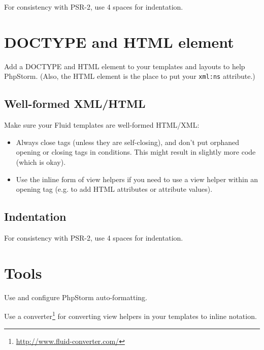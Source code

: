 For consistency with PSR-2, use 4 spaces for indentation.


\section{DOCTYPE and HTML element}
Add a DOCTYPE and HTML element to your templates and layouts to help PhpStorm. (Also, the HTML element is the place to put your \texttt{xml:ns} attribute.)

\subsection{Well-formed XML/HTML}

Make sure your Fluid templates are well-formed HTML/XML:

\begin{itemize}
  \item Always close tags (unless they are self-closing), and don't put orphaned opening or closing tags in conditions. This might result in slightly more code (which is okay).
  \item Use the inline form of view helpers if you need to use a view helper within an opening tag (e.g. to add HTML attributes or attribute values).
\end{itemize}

\subsection{Indentation}
For consistency with PSR-2, use 4 spaces for indentation.

\section{Tools}

Use and configure PhpStorm auto-formatting.

Use a converter\footnote{\url{http://www.fluid-converter.com/}} for converting view helpers in your templates to inline notation.
